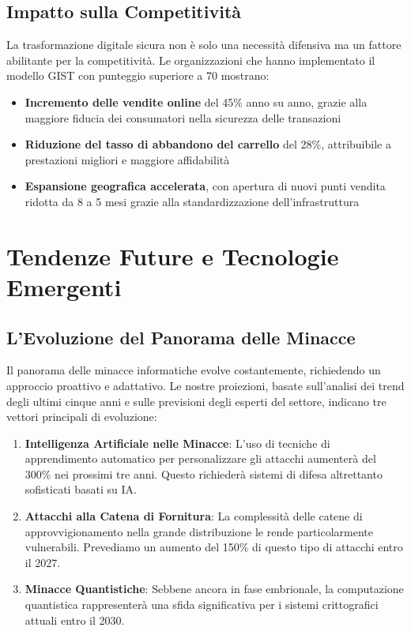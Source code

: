 \subsection{\texorpdfstring{Impatto sulla Competitività}{5.5.2 - Impatto sulla Competitività}}
\label{subsec:5.5.2}

La trasformazione digitale sicura non è solo una necessità difensiva ma un fattore abilitante per la competitività. Le organizzazioni che hanno implementato il modello GIST con punteggio superiore a 70 mostrano:

\begin{itemize}
\item \textbf{Incremento delle vendite online} del 45\% anno su anno, grazie alla maggiore fiducia dei consumatori nella sicurezza delle transazioni
\item \textbf{Riduzione del tasso di abbandono del carrello} del 28\%, attribuibile a prestazioni migliori e maggiore affidabilità
\item \textbf{Espansione geografica accelerata}, con apertura di nuovi punti vendita ridotta da 8 a 5 mesi grazie alla standardizzazione dell'infrastruttura
\end{itemize}

\section{\texorpdfstring{Tendenze Future e Tecnologie Emergenti}{5.6 - Tendenze Future e Tecnologie Emergenti}}
\label{sec:5.6}

\subsection{\texorpdfstring{L'Evoluzione del Panorama delle Minacce}{5.6.1 - L'Evoluzione del Panorama delle Minacce}}
\label{subsec:5.6.1}

Il panorama delle minacce informatiche evolve costantemente, richiedendo un approccio proattivo e adattativo. Le nostre proiezioni, basate sull'analisi dei trend degli ultimi cinque anni e sulle previsioni degli esperti del settore, indicano tre vettori principali di evoluzione:

\begin{enumerate}
\item \textbf{Intelligenza Artificiale nelle Minacce}: L'uso di tecniche di apprendimento automatico per personalizzare gli attacchi aumenterà del 300\% nei prossimi tre anni. Questo richiederà sistemi di difesa altrettanto sofisticati basati su IA.

\item \textbf{Attacchi alla Catena di Fornitura}: La complessità delle catene di approvvigionamento nella grande distribuzione le rende particolarmente vulnerabili. Prevediamo un aumento del 150\% di questo tipo di attacchi entro il 2027.

\item \textbf{Minacce Quantistiche}: Sebbene ancora in fase embrionale, la computazione quantistica rappresenterà una sfida significativa per i sistemi crittografici attuali entro il 2030.
\end{enumerate}
